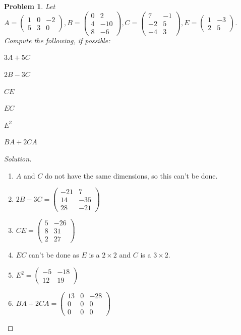 \documentclass[oneside]{book}
\theoremstyle{mystyle}
\newtheorem{problem}{Problem}[section]
\begin{document}
\begin{problem}
Let $A = \begin{pmatrix} 1 & 0 & -2 \\ 5 & 3 & 0 \end{pmatrix}, B = \begin{pmatrix} 0 & 2 \\ 4 & -10 \\ 8 & -6 \end{pmatrix}, C = \begin{pmatrix} 7 & -1 \\ -2 & 5 \\ -4 & 3 \end{pmatrix}, E = \begin{pmatrix} 1 & -3 \\ 2 & 5 \end{pmatrix}$. Compute the following, if possible:
\begin{enumerate}
\begin{multicols}{6}
    \item $3A+5C$
    \item $2B-3C$
    \item $CE$
    \item $EC$
    \item $E^2$
    \item $BA+2CA$
\end{multicols}
\end{enumerate}
\end{problem}
\begin{proof}[Solution]
\
\begin{enumerate}
    \item $A$ and $C$ do not have the same dimensions, so this can't be done.
    \item $2B - 3C = \begin{pmatrix} -21 & 7 \\ 14 & -35 \\ 28 & -21 \end{pmatrix}$
    \item $CE = \begin{pmatrix} 5 & -26 \\ 8 & 31 \\ 2 & 27 \end{pmatrix}$
    \item $EC$ can't be done as $E$ is a $2\times 2$ and $C$ is a $3\times 2$.
    \item $E^2 = \begin{pmatrix} -5 & -18 \\ 12 & 19 \end{pmatrix}$
    \item $BA + 2CA = \begin{pmatrix} 13 & 0 & -28 \\ 0 & 0 & 0 \\ 0 & 0 & 0 \end{pmatrix}$
\end{enumerate}
\end{proof}
\end{document}
